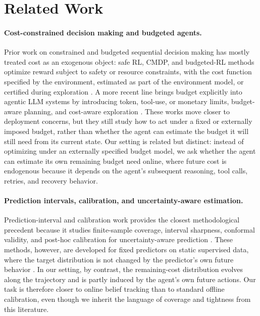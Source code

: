 
\section{Related Work}
\label{sec:related-work}

\paragraph{Cost-constrained decision making and budgeted agents.}
Prior work on constrained and budgeted sequential decision making has mostly treated cost as an exogenous object: safe RL, CMDP, and budgeted-RL methods optimize reward subject to safety or resource constraints, with the cost function specified by the environment, estimated as part of the environment model, or certified during exploration \cite{achiam2017constrained,tessler2019reward,carrara2019budgeted,wachi2020safe,zheng2020constrained,liu2022constrainedvariational,li2023nearoptimal,mazumdar2024safe}. A more recent line brings budget explicitly into agentic LLM systems by introducing token, tool-use, or monetary limits, budget-aware planning, and cost-aware exploration \cite{zhou2026adaptive,liu2026budgetconstrained,ding2026calibratethenact,mccleary2026quantifying}. These works move closer to deployment concerns, but they still study how to act under a fixed or externally imposed budget, rather than whether the agent can estimate the budget it will still need from its current state. Our setting is related but distinct: instead of optimizing under an externally specified budget model, we ask whether the agent can estimate its own remaining budget need online, where future cost is endogenous because it depends on the agent's subsequent reasoning, tool calls, retries, and recovery behavior.

\paragraph{Prediction intervals, calibration, and uncertainty-aware estimation.}
Prediction-interval and calibration work provides the closest methodological precedent because it studies finite-sample coverage, interval sharpness, conformal validity, and post-hoc calibration for uncertainty-aware prediction \cite{lei2018distributionfree,pearce2018highquality,kuleshov2018accurate,romano2019conformalized,amini2020deep,chung2021beyond,levi2022evaluating}. These methods, however, are developed for fixed predictors on static supervised data, where the target distribution is not changed by the predictor's own future behavior \cite{lei2018distributionfree,romano2019conformalized,levi2022evaluating}. In our setting, by contrast, the remaining-cost distribution evolves along the trajectory and is partly induced by the agent's own future actions. Our task is therefore closer to online belief tracking than to standard offline calibration, even though we inherit the language of coverage and tightness from this literature.

